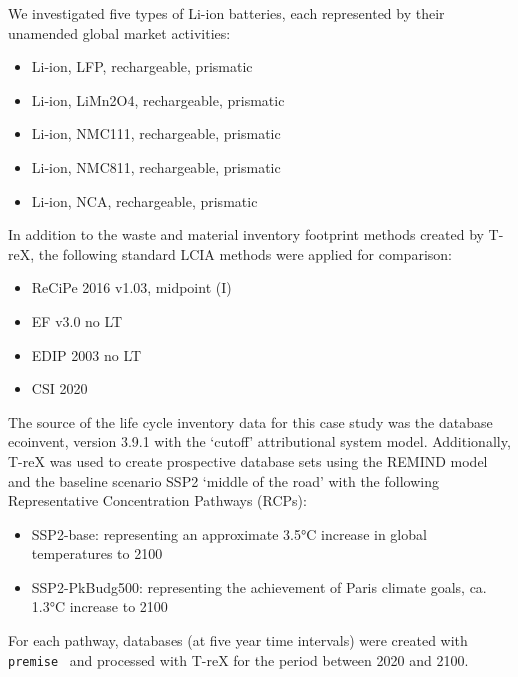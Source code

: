 We investigated five types of Li-ion batteries, each represented by their unamended global market activities:
\begin{itemize}[itemsep=0pt]
    \item Li-ion, LFP, rechargeable, prismatic
    \item Li-ion, LiMn2O4, rechargeable, prismatic
    \item Li-ion, NMC111, rechargeable, prismatic
    \item Li-ion, NMC811, rechargeable, prismatic
    \item Li-ion, NCA, rechargeable, prismatic
\end{itemize}

In addition to the waste and material inventory footprint methods created by T-reX, the following standard LCIA methods were applied for comparison:

\begin{itemize}[itemsep=0pt]
    \item ReCiPe 2016 v1.03, midpoint (I)
    \item EF v3.0 no LT
    \item EDIP 2003 no LT
    \item CSI 2020
\end{itemize}

The source of the life cycle inventory data for this case study was the database ecoinvent, version 3.9.1 with the `cutoff' attributional system model. Additionally, T-reX was used to create prospective database sets using the REMIND model and the baseline scenario SSP2 `middle of the road' with the following Representative Concentration Pathways (RCPs):
\begin{itemize}
    \item SSP2-base: representing an approximate 3.5°C increase in global temperatures to 2100
    \item SSP2-PkBudg500: representing the achievement of Paris climate goals, ca. 1.3°C increase to 2100
\end{itemize}

For each pathway, databases (at five year time intervals) were created with \texttt{premise}~\citep{sacchi2022premise} and processed with T-reX for the period between 2020 and 2100.


